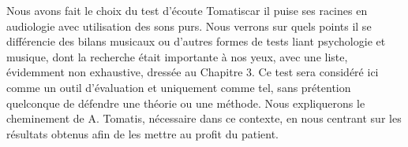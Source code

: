  
 

 
  Nous  avons fait le choix du test d'écoute Tomatis\textsuperscript \textregistered  car il 
 puise ses racines  en 
 audiologie avec utilisation des sons purs.
 Nous verrons sur quels points il se différencie des bilans musicaux 
 ou 
 d'autres formes de tests liant psychologie et musique, dont la recherche était importante à nos yeux, 
 avec une liste, 
 évidemment non exhaustive, dressée au Chapitre 3. 
  Ce test sera considéré ici 
 comme un outil d'évaluation et uniquement comme tel, sans prétention quelconque de défendre une 
 théorie ou une 
 méthode. Nous expliquerons le cheminement de A. Tomatis, nécessaire dans ce contexte, en  nous 
 centrant sur les 
 résultats obtenus afin de les mettre 
 au profit du patient.
 

